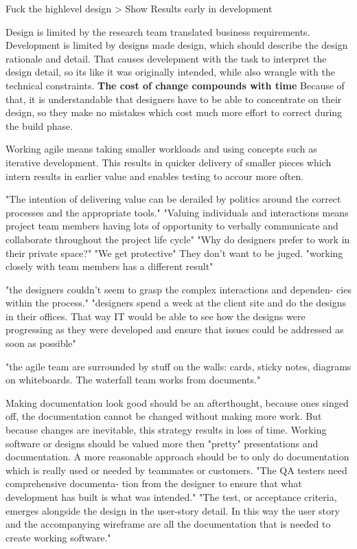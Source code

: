 Fuck the highlevel design > Show Results early in development

Design is limited by the research team translated business requirements.
Development is limited by designs made design, which should describe the design rationale and detail.
That causes develepment with the task to interpret the design detail, so its like it was originally intended, while also wrangle with the technical constraints. 
\textbf{The cost of change compounds with time}
Because of that, it is understandable that designers have to be able to concentrate on their design, so they make no mistakes which cost much more effort to correct during the build phase.
\citep{ratcliffe2011agile:22}

Working agile means taking smaller workloads and using concepts such as iterative development. This results in quicker delivery of smaller pieces which intern results in earlier value and enables testing to accour more often. \citep{ratcliffe2011agile:25} 

"The intention of delivering value can be derailed by politics around the correct processes and the appropriate tools."
"Valuing individuals and interactions means project team members having lots of opportunity to verbally communicate and collaborate throughout the project life cycle"
"Why do designers prefer to work in their private space?" "We get protective" They don't want to be juged.
"working closely with team members has a different result"
\citep{ratcliffe2011agile:25}

"the designers couldn’t seem to grasp the complex interactions and dependen- cies within the process."
"designers spend a week at the client site and do the designs in their offices. That way IT would be able to see how the designs were progressing as they were developed and ensure that issues could be addressed as soon as possible" \citep{ratcliffe2011agile:26}

"the agile team are surrounded by stuff on the walls: cards, sticky notes, diagrams on whiteboards. The waterfall team works from documents." \citep{ratcliffe2011agile:27}

Making documentation look good should be an afterthought, because ones singed off, the documentation cannot be changed without making more work. But because changes are inevitable, this strategy results in loss of time. Working software or designs should be valued more then "pretty" presentations and documentation. \citep{ratcliffe2011agile:29}
A more reasonable approach should be to only do documentation which is really used or needed by teammates or customers.
"The QA testers need comprehensive documenta- tion from the designer to ensure that what development has built is what was intended." \citep{ratcliffe2011agile:29}
"The test, or acceptance criteria, emerges alongside the design in the user-story detail. In this way the user story and the accompanying wireframe are all the documentation that is needed to create working software." \citep{ratcliffe2011agile:29}


